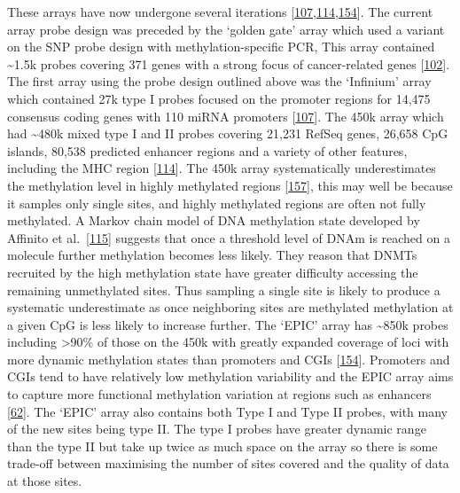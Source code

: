 \documentclass[
]{book}
\begin{document}
These arrays have now undergone several iterations {[}\protect\hyperlink{ref-Bibikova2009}{107},\protect\hyperlink{ref-Bibikova2011}{114},\protect\hyperlink{ref-Moran2015}{154}{]}.
The current array probe design was preceded by the `golden gate' array which used a variant on the SNP probe design with methylation-specific PCR, This array contained \textasciitilde1.5k probes covering 371 genes with a strong focus of cancer-related genes {[}\protect\hyperlink{ref-Bibikova2006}{102}{]}.
The first array using the probe design outlined above was the `Infinium' array which contained 27k type I probes focused on the promoter regions for 14,475 consensus coding genes with 110 miRNA promoters {[}\protect\hyperlink{ref-Bibikova2009}{107}{]}.
The 450k array which had \textasciitilde480k mixed type I and II probes covering 21,231 RefSeq genes, 26,658 CpG islands, 80,538 predicted enhancer regions and a variety of other features, including the MHC region {[}\protect\hyperlink{ref-Bibikova2011}{114}{]}.
The 450k array systematically underestimates the methylation level in highly methylated regions {[}\protect\hyperlink{ref-Clark2012}{157}{]}, this may well be because it samples only single sites, and highly methylated regions are often not fully methylated.
A Markov chain model of DNA methylation state developed by Affinito et al.~{[}\protect\hyperlink{ref-Affinito2016}{115}{]} suggests that once a threshold level of DNAm is reached on a molecule further methylation becomes less likely.
They reason that DNMTs recruited by the high methylation state have greater difficulty accessing the remaining unmethylated sites.
Thus sampling a single site is likely to produce a systematic underestimate as once neighboring sites are methylated methylation at a given CpG is less likely to increase further.
The `EPIC' array has \textasciitilde850k probes including \textgreater90\% of those on the 450k with greatly expanded coverage of loci with more dynamic methylation states than promoters and CGIs {[}\protect\hyperlink{ref-Moran2015}{154}{]}.
Promoters and CGIs tend to have relatively low methylation variability and the EPIC array aims to capture more functional methylation variation at regions such as enhancers {[}\protect\hyperlink{ref-Ziller2013}{62}{]}.
The `EPIC' array also contains both Type I and Type II probes, with many of the new sites being type II.
The type I probes have greater dynamic range than the type II but take up twice as much space on the array so there is some trade-off between maximising the number of sites covered and the quality of data at those sites.
\end{document}
